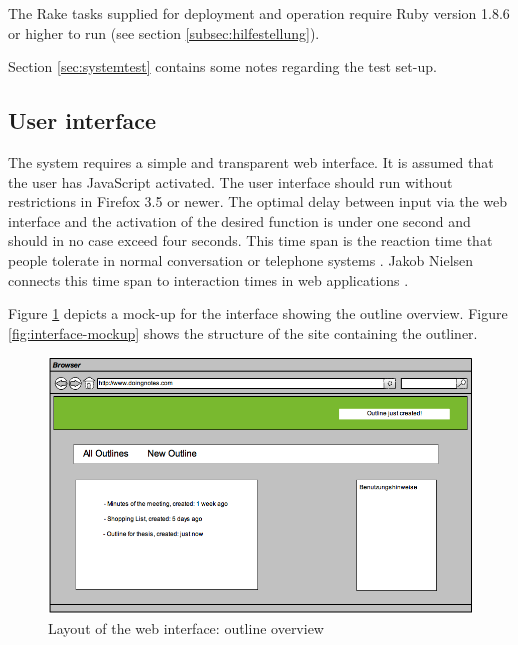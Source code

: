 The Rake tasks supplied for deployment and operation require Ruby version 1.8.6 or higher to run (see section \ref{subsec:hilfestellung}).

Section \ref{sec:systemtest} contains some notes regarding the test set-up.

\subsection{User interface}
\label{subsec:gui-anf}

The system requires a simple and transparent web interface. It is assumed that the user has JavaScript activated. The user interface should run without restrictions in Firefox 3.5 or newer. The optimal delay between input via the web interface and the activation of the desired function is under one second and should in no case exceed four seconds. This time span is the reaction time that people tolerate in normal conversation or telephone systems . Jakob Nielsen connects this time span to interaction times in web applications .

Figure \ref{fig:interface-mockup-list} depicts a mock-up for the interface showing the outline overview. Figure \ref{fig:interface-mockup} shows the structure of the site containing the outliner.

\medskip
\begin{figure}[ht] 
  \begin{center}
  \includegraphics[width=\textwidth]{grafik/user-interface-mockup-list} 
  \end{center}
  \caption{Layout of the web interface: outline overview}
  \label{fig:interface-mockup-list} 
\end{figure}

